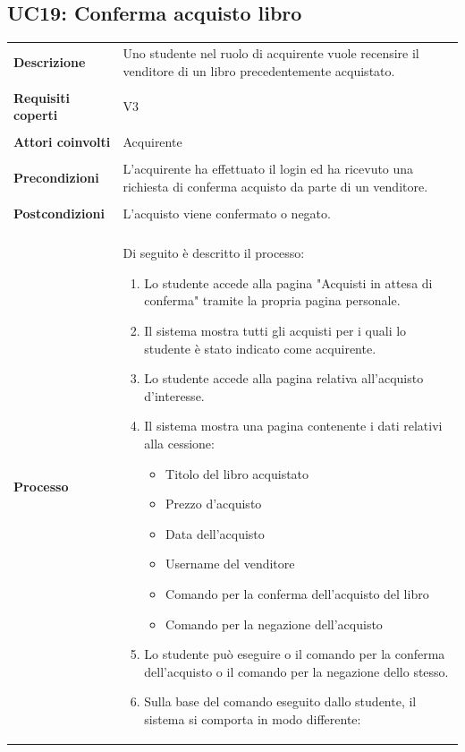 \documentclass[10pt,a4paper]{article}
\begin{document}
	\subsection{UC19: Conferma acquisto libro}
	\begin{tabular}{lp{}}
		\textbf{Descrizione}&Uno studente nel ruolo di acquirente vuole recensire il venditore di un libro precedentemente acquistato.\\
		\\
		\textbf{Requisiti coperti}&V3\\
		\\
		\textbf{Attori coinvolti}&Acquirente\\
		\\
		\textbf{Precondizioni}&L'acquirente ha effettuato il login ed ha ricevuto una richiesta di conferma acquisto da parte di un venditore.\\
		\\
		\textbf{Postcondizioni}&L'acquisto viene confermato o negato.\\
		\\
		\textbf{Processo}&Di seguito è descritto il processo:
		\begin{enumerate}
			\item Lo studente accede alla pagina "Acquisti in attesa di conferma" tramite la propria pagina personale.
			\item Il sistema mostra tutti gli acquisti per i quali lo studente è stato indicato come acquirente.
			\item Lo studente accede alla pagina relativa all'acquisto d'interesse.
			\item Il sistema mostra una pagina contenente i dati relativi alla cessione:
			\begin{itemize}
				\item Titolo del libro acquistato
				\item Prezzo d'acquisto
				\item Data dell'acquisto
				\item Username del venditore
				\item Comando per la conferma dell'acquisto del libro
				\item Comando per la negazione dell'acquisto
			\end{itemize}
			\item Lo studente può eseguire o il comando per la conferma dell'acquisto o il comando per la negazione dello stesso.
			\item Sulla base del comando eseguito dallo studente, il sistema si comporta in modo differente:

\end{enumerate}
\end{tabular}
\end{document}
